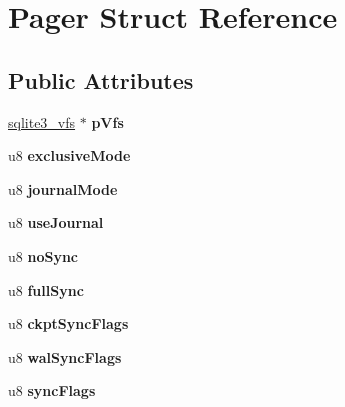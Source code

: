 \hypertarget{struct_pager}{\section{Pager Struct Reference}
\label{struct_pager}
}
\subsection*{Public Attributes}
\begin{DoxyCompactItemize}
\item 
\hypertarget{struct_pager_affa78e08a7f691a4c8f7043e0b4c9212}{\hyperlink{structsqlite3__vfs}{sqlite3\-\_\-vfs} $\ast$ {\bfseries p\-Vfs}}\label{struct_pager_affa78e08a7f691a4c8f7043e0b4c9212}

\item 
\hypertarget{struct_pager_a5cbccc156e07d6226cb65a7ab05ac116}{u8 {\bfseries exclusive\-Mode}}\label{struct_pager_a5cbccc156e07d6226cb65a7ab05ac116}

\item 
\hypertarget{struct_pager_a9ad7bd09f1c9323d943ee17ddf42e46e}{u8 {\bfseries journal\-Mode}}\label{struct_pager_a9ad7bd09f1c9323d943ee17ddf42e46e}

\item 
\hypertarget{struct_pager_af7783f866150d7e322c28cb324ad85d6}{u8 {\bfseries use\-Journal}}\label{struct_pager_af7783f866150d7e322c28cb324ad85d6}

\item 
\hypertarget{struct_pager_ae943093a3ccbfbf264ccf3c8a52edac1}{u8 {\bfseries no\-Sync}}\label{struct_pager_ae943093a3ccbfbf264ccf3c8a52edac1}

\item 
\hypertarget{struct_pager_abae5c9c3d85120ae266acc4c9a355b86}{u8 {\bfseries full\-Sync}}\label{struct_pager_abae5c9c3d85120ae266acc4c9a355b86}

\item 
\hypertarget{struct_pager_a4543ec92953e7bda49b3ed4f0bdab890}{u8 {\bfseries ckpt\-Sync\-Flags}}\label{struct_pager_a4543ec92953e7bda49b3ed4f0bdab890}

\item 
\hypertarget{struct_pager_aa8c8c2d893e4d2165f089ddde3e85103}{u8 {\bfseries wal\-Sync\-Flags}}\label{struct_pager_aa8c8c2d893e4d2165f089ddde3e85103}

\item 
\hypertarget{struct_pager_ac7f90d27da63090369a0e44a0bceb525}{u8 {\bfseries sync\-Flags}}\label{struct_pager_ac7f90d27da63090369a0e44a0bceb525}


\end{DoxyCompactItemize}
